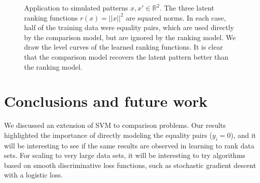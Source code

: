 \documentclass{article}
\newcommand{\RR}{\mathbb R}
\begin{document}
\begin{figure}[b!]
  \centering
  
  \caption{Application to simulated patterns $x,x'\in\RR^2$. The three
    latent ranking functions $r(x)=||x||^2$ are squared norms. In each
    case, half of the training data were equality pairs, which are
    used directly by the comparison model, but are ignored by the
    ranking model.  We draw the level curves of the learned ranking
    functions.  It is clear that the comparison model recovers the
    latent pattern better than the ranking model.}
  \label{fig:norms}
\end{figure}


\section{Conclusions and future work}
\label{sec:conclusions}

We discussed an extension of SVM to comparison problems. Our results
highlighted the importance of directly modeling the equality pairs
($y_i=0$), and it will be interesting to see if the same results are
observed in learning to rank data sets. For scaling to very large data
sets, it will be interesting to try algorithms based on smooth
discriminative loss functions, such as stochastic gradient descent
with a logistic loss.



\end{document}
